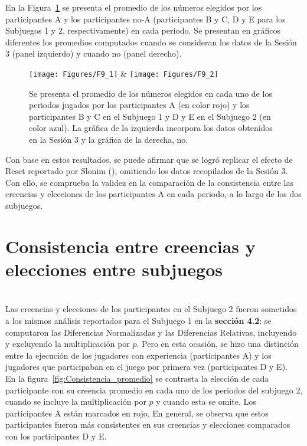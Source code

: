En la Figura~\ref{fig:ParticipantesA_promedio} se presenta el promedio de los números elegidos por los participantes A y los participantes no-A (participantes B y C, D y E para los Subjuegos 1 y 2, respectivamente) en cada periodo. Se presentan en gráficos diferentes los promedios computados cuando se consideran los datos de la Sesión 3 (panel izquierdo) y cuando no (panel derecho).\\
  
\begin{figure}[h]
\centering
\texttt{[image: Figures/F9\_1]} & \texttt{[image: Figures/F9\_2]} 
\decoRule
\caption[Promedio de los números elegidos por los participantes A y no-A en cada uno de los periodos jugados]{Se presenta el promedio de los números elegidos en cada uno de los periodos jugados por los participantes A (en color rojo) y los participantes B y C en el Subjuego 1 y D y E en el Subjuego 2 (en color azul). La gráfica de la izquierda incorpora los datos obtenidos en la Sesión 3 y la gráfica de la derecha, no.}
\label{fig:ParticipantesA_promedio}
\end{figure}  

Con base en estos resultados, se puede afirmar que se logró replicar el efecto de Reset reportado por Slonim (\citeyear{Slonim}), omitiendo los datos recopilados de la Sesión 3. Con ello, se comprueba la validez en la comparación de la consistencia entre las creencias y elecciones de los participantes A en cada periodo, a lo largo de los dos subjuegos.\\

\section{Consistencia entre creencias y elecciones entre subjuegos}\\

Las creencias y elecciones de los participantes en el Subjuego 2 fueron sometidos a los mismos análisis reportados para el Subjuego 1 en la \textbf{sección 4.2}: se computaron las Diferencias Normalizadas y las Diferencias Relativas, incluyendo y excluyendo la multiplicación por $p$. Pero en esta ocasión, se hizo una distinción entre la ejecución de los jugadores con experiencia (participantes A) y los jugadores que participaban en el juego por primera vez (participantes D y E).\\

En la figura~\ref{fig:Consistencia_promedio} se contrasta la elección de cada participante con su creencia promedio en cada uno de los periodos del subjuego 2, cuando se incluye la multiplicación por $p$ y cuando esta se omite. Los participantes A están marcados en rojo. En general, se observa que estos participantes fueron más consistentes en sus creencias y elecciones comparados con los participantes D y E.\\

